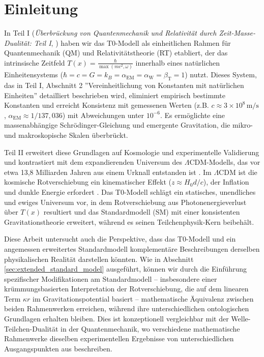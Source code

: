 \documentclass[12pt,a4paper]{article}
\newcommand{\Tfield}{T(x)}
\newcommand{\alphaEM}{\alpha_{\text{EM}}}
\newcommand{\alphaW}{\alpha_{\text{W}}}
\newcommand{\betaT}{\beta_{\text{T}}}
\newcommand{\LCDM}{\Lambda\text{CDM}}
\begin{document}
	\section{Einleitung}
	In Teil I (\textit{Überbrückung von Quantenmechanik und Relativität durch Zeit-Masse-Dualität: Teil I}, \cite{pascher_part1_2025}) haben wir das T0-Modell als einheitlichen Rahmen für Quantenmechanik (QM) und Relativitätstheorie (RT) etabliert, der das intrinsische Zeitfeld \(\Tfield = \frac{\hbar}{\max(mc^2, \omega)}\) innerhalb eines natürlichen Einheitensystems (\(\hbar = c = G = k_B = \alphaEM = \alphaW = \betaT = 1\)) nutzt. Dieses System, das in Teil I, Abschnitt 2 ''Vereinheitlichung von Konstanten mit natürlichen Einheiten'' \cite{pascher_part1_2025} detailliert beschrieben wird, eliminiert empirisch bestimmte Konstanten und erreicht Konsistenz mit gemessenen Werten (z.B. \(c \approx 3 \times 10^8 \, \text{m/s}\), \(\alphaEM \approx 1/137,036\)) mit Abweichungen unter \(10^{-6}\). Es ermöglichte eine massenabhängige Schrödinger-Gleichung und emergente Gravitation, die mikro- und makroskopische Skalen überbrückt.
	
	Teil II erweitert diese Grundlagen auf Kosmologie und experimentelle Validierung und kontrastiert mit dem expandierenden Universum des \(\LCDM\)-Modells, das vor etwa 13,8 Milliarden Jahren aus einem Urknall entstanden ist \cite{Planck2020}. Im \(\LCDM\) ist die kosmische Rotverschiebung ein kinematischer Effekt (\(z \approx H_0 d / c\)), der Inflation und dunkle Energie erfordert \cite{Riess1998,Perlmutter1999}. Das T0-Modell schlägt ein statisches, unendliches und ewiges Universum vor, in dem Rotverschiebung aus Photonenergieverlust über \(\Tfield\) resultiert und das Standardmodell (SM) mit einer konsistenten Gravitationstheorie erweitert, während es seinen Teilchenphysik-Kern beibehält.
	
	Diese Arbeit untersucht auch die Perspektive, dass das T0-Modell und ein angemessen erweitertes Standardmodell komplementäre Beschreibungen derselben physikalischen Realität darstellen könnten. Wie in Abschnitt \ref{sec:extended_standard_model} ausgeführt, können wir durch die Einführung spezifischer Modifikationen am Standardmodell – insbesondere einer krümmungsbasierten Interpretation der Rotverschiebung, die auf dem linearen Term \(\kappa r\) im Gravitationspotential basiert – mathematische Äquivalenz zwischen beiden Rahmenwerken erreichen, während ihre unterschiedlichen ontologischen Grundlagen erhalten bleiben. Dies ist konzeptionell vergleichbar mit der Welle-Teilchen-Dualität in der Quantenmechanik, wo verschiedene mathematische Rahmenwerke dieselben experimentellen Ergebnisse von unterschiedlichen Ausgangspunkten aus beschreiben.
	
\end{document}
